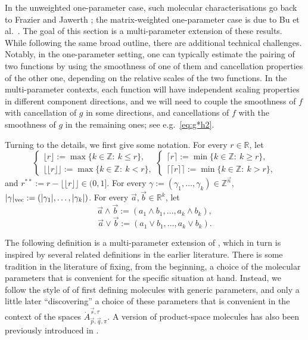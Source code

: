 \documentclass[11pt, reqno]{amsart}
\theoremstyle{definition}
\theoremstyle{remark}
\numberwithin{equation}{section}
\newcommand{\vp}{\vec p}
\newcommand{\vq}{\vec q}
\newcommand{\vs}{\vec s}
\newcommand{\Atau}{\dot A^{\vs,\tau}_{\vp,\vq,\pi}}
\begin{document}
In the unweighted one-parameter case, such molecular characterisations go back to Frazier and Jawerth \cite{FJ90}; the matrix-weighted one-parameter case is due to Bu et al.\ \cite{BHYY:1c}. The goal of this section is a multi-parameter extension of these results. While following the same broad outline, there are additional technical challenges. Notably, in the one-parameter setting, one can typically estimate the pairing of two functions by using the smoothness of one of them and cancellation properties of the other one, depending on the relative scales of the two functions. In the multi-parameter contexts, each function will have independent scaling properties in different component directions, and we will need to couple the smoothness of $f$ with cancellation of $g$ in some directions, and cancellations of $f$ with the smoothness of $g$ in the remaining ones; see e.g.\ \eqref{eq:g*h2}.

Turning to the details, we first give some notation. For every $r\in\mathbb R$, let
\begin{equation*}
\begin{cases}
\lfloor r\rfloor:=\max\{k\in\mathbb Z:\ k\leq r\},\\
\lfloor\!\lfloor r\rfloor\!\rfloor:=\max\{k\in\mathbb Z:\ k< r\},
\end{cases}
\begin{cases}
\lceil r\rceil:=\min\{k\in\mathbb Z:\ k\geq r\},\\
\lceil\!\lceil r\rceil\!\rceil:=\min\{k\in\mathbb Z:\ k>r\},
\end{cases}
\end{equation*}
and $r^{**}:=r-\lfloor\!\lfloor r\rfloor\!\rfloor\in(0,1]$.
For every $\gamma:=(\gamma_1,\ldots,\gamma_k)\in\mathbb{Z}^{\vec n}$,
$|\gamma|_{\rm{vec}}:=(|\gamma_1|,\ldots,|\gamma_k|)$.
For every $\vec a,\vec b\in\mathbb R^k$, let
$$
\vec a\wedge \vec b:=(a_1\wedge b_1,\ldots,a_k\wedge b_k),
$$
$$
\vec a\vee \vec b:=(a_1\vee b_1,\ldots,a_k\vee b_k).
$$

The following definition is a multi-parameter extension of \cite[Definition 3.4]{BHYY:1c}, which in turn is inspired by several related definitions in the earlier literature. There is some tradition in the literature of fixing, from the beginning, a choice of the molecular parameters that is convenient for the specific situation at hand. Instead, we follow the style of \cite{BHYY:1c} of first defining molecules with generic parameters, and only a little later ``discovering'' a choice of these parameters that is convenient in the context of the spaces $\Atau$.
A version of product-space molecules has also been previously introduced in \cite[Definition 14]{LLZ}.
\end{document}
